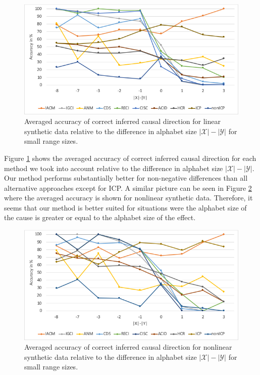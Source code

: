 \documentclass[letterpaper]{article}
\newcommand{\kX}{\mathcal{X}}   %
\newcommand{\kY}{\mathcal{Y}}   %
\begin{document}
\begin{figure}[h]
 \begin{minipage}[c]{\textwidth}
 \centering
		  \includegraphics[scale=2.5]{result_linear_discrete.png}
        \caption{Averaged accuracy of correct inferred causal direction for linear synthetic data relative to the difference in alphabet size $|\kX| - |\kY|$ for small range sizes. }
        \label{fig:discrete_linear}
 \end{minipage}
  \end{figure}
  
Figure \ref{fig:discrete_linear} shows the averaged accuracy of correct inferred causal direction for each method we took into account relative to the difference in alphabet size $|\kX| - |\kY|$. Our method performs substantially better for non-negative differences than all alternative approaches except for ICP. A similar picture can be seen in Figure \ref{fig:discrete_nonlinear} where the averaged accuracy is shown for nonlinear synthetic data. Therefore, it seems that our method is better suited for situations were the alphabet size of the cause is greater or equal to the alphabet size of the effect.
 
\begin{figure}[h]
\begin{minipage}[c]{\textwidth}
\centering
         \includegraphics[scale=2.5]{result_nonlin_discrete.png}
        \caption{Averaged accuracy of correct inferred causal direction for nonlinear synthetic data relative to the difference in alphabet size $|\kX| - |\kY|$ for small range sizes. }
        \label{fig:discrete_nonlinear}
 \end{minipage}
\end{figure}
\end{document}
